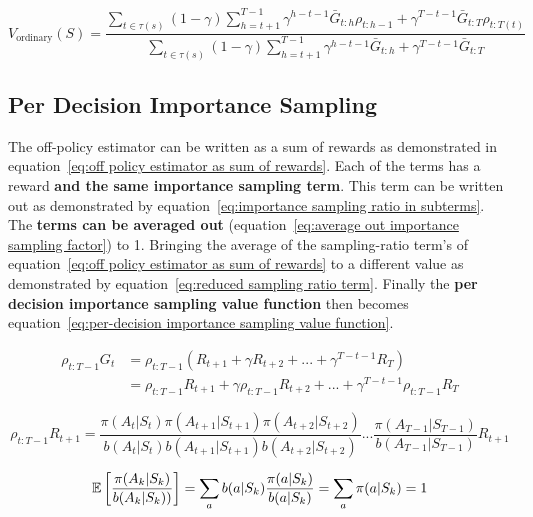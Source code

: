 \begin{equation}
V_{\text{ordinary}}(S) = \frac{\sum_{t\in\tau(s)}(1-\gamma)\sum_{h=t+1}^{T-1}\gamma^{h-t-1}\bar{G}_{t:h}\rho_{t:h-1} + \gamma^{T-t-1}\bar{G}_{t:T}\rho_{t:T(t)}}{\sum_{t\in\tau(s)}(1-\gamma)\sum_{h=t+1}^{T-1}\gamma^{h-t-1}\bar{G}_{t:h} + \gamma^{T-t-1}\bar{G}_{t:T}}
\label{eq:discount-aware weighted importance sampling}
\end{equation}

\subsection{Per Decision Importance Sampling}

The off-policy estimator can be written as a sum of rewards as demonstrated in equation~\ref{eq:off policy estimator as sum of rewards}. Each of the terms has a reward \textbf{and the same importance sampling term}. This term can be written out as demonstrated by equation~\ref{eq:importance sampling ratio in subterms}. The \textbf{terms can be averaged out} (equation~\ref{eq:average out importance sampling factor}) to 1. Bringing the average of the sampling-ratio term's of equation~\ref{eq:off policy estimator as sum of rewards} to a different value as demonstrated by equation~\ref{eq:reduced sampling ratio term}. Finally the \textbf{per decision importance sampling value function} then becomes equation~\ref{eq:per-decision importance sampling value function}.

\begin{equation}
\begin{split}
\rho_{t:T-1}G_t & = \rho_{t:T-1} (R_{t+1} + \gamma R_{t+2} + ... + \gamma^{T-t-1}R_T) \\
& = \rho_{t:T-1}R_{t+1}  + \gamma \rho_{t:T-1} R_{t+2} + ... +  \gamma^{T-t-1}\rho_{t:T-1}R_T
\end{split}
\label{eq:off policy estimator as sum of rewards}
\end{equation}

\begin{equation}
\rho_{t:T-1}R_{t+1} = 
\frac	
	{\pi(A_t|S_t)\pi(A_{t+1}|S_{t+1})\pi(A_{t+2}|S_{t+2})}
	{b(A_t|S_t)b(A_{t+1}|S_{t+1})b(A_{t+2}|S_{t+2})}
...
\frac{\pi(A_{T-1}|S_{T-1})}{b(A_{T-1}|S_{T-1})} R_{t+1}
\label{eq:importance sampling ratio in subterms}
\end{equation}

\begin{equation}
\operatorname{\mathbb{E}} \left[\frac{\pi(A_k|S_k)}{b(A_k|S_k))}\right] = \sum_a b(a|S_k)\frac{\pi(a|S_k)}{b(a|S_k)} = \sum_a \pi(a|S_k) = 1
\label{eq:average out importance sampling factor}
\end{equation}


